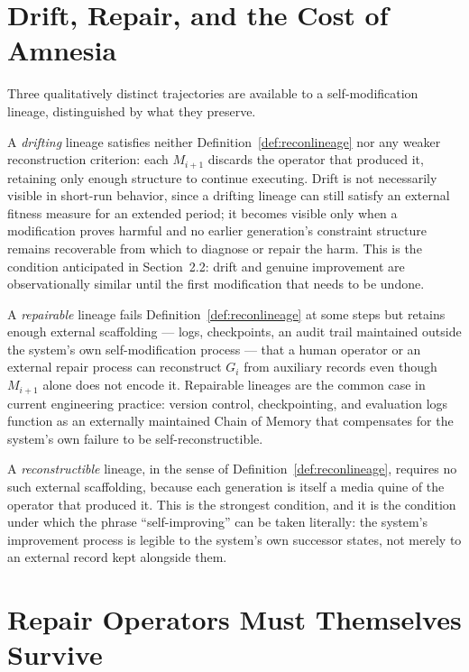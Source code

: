 \documentclass[11pt]{book}
\begin{document}
\section{Drift, Repair, and the Cost of Amnesia}

Three qualitatively distinct trajectories are available to a self-modification lineage, distinguished by what they preserve.

A \emph{drifting} lineage satisfies neither Definition~\ref{def:reconlineage} nor any weaker reconstruction criterion: each $M_{i+1}$ discards the operator that produced it, retaining only enough structure to continue executing. Drift is not necessarily visible in short-run behavior, since a drifting lineage can still satisfy an external fitness measure for an extended period; it becomes visible only when a modification proves harmful and no earlier generation's constraint structure remains recoverable from which to diagnose or repair the harm. This is the condition anticipated in Section~2.2: drift and genuine improvement are observationally similar until the first modification that needs to be undone.

A \emph{repairable} lineage fails Definition~\ref{def:reconlineage} at some steps but retains enough external scaffolding --- logs, checkpoints, an audit trail maintained outside the system's own self-modification process --- that a human operator or an external repair process can reconstruct $G_i$ from auxiliary records even though $M_{i+1}$ alone does not encode it. Repairable lineages are the common case in current engineering practice: version control, checkpointing, and evaluation logs function as an externally maintained Chain of Memory that compensates for the system's own failure to be self-reconstructible.

A \emph{reconstructible} lineage, in the sense of Definition~\ref{def:reconlineage}, requires no such external scaffolding, because each generation is itself a media quine of the operator that produced it. This is the strongest condition, and it is the condition under which the phrase ``self-improving'' can be taken literally: the system's improvement process is legible to the system's own successor states, not merely to an external record kept alongside them.

\section{Repair Operators Must Themselves Survive}
\end{document}
